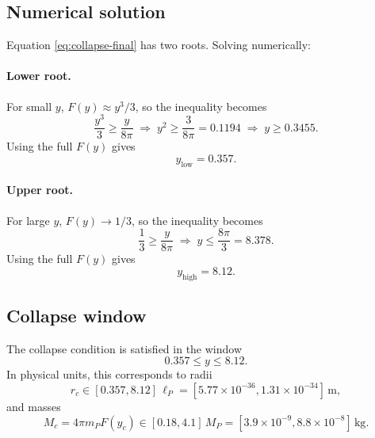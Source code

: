 \documentclass[a4paper,7pt,oneside,openany]{book}
\begin{document}
\subsection{Numerical solution}

Equation \eqref{eq:collapse-final} has two roots. Solving 
numerically:

\paragraph{Lower root.}
For small $y$, $F(y)\approx y^{3}/3$, so the inequality becomes
\begin{equation}
\frac{y^{3}}{3}\ge\frac{y}{8\pi}
\;\Longrightarrow\;
y^{2}\ge\frac{3}{8\pi}=0.1194
\;\Longrightarrow\;
y\ge0.3455.
\label{eq:lower-approx}
\end{equation}
Using the full $F(y)$ gives
\begin{equation}
y_{\text{low}}=0.357.
\label{eq:ylow}
\end{equation}

\paragraph{Upper root.}
For large $y$, $F(y)\to 1/3$, so the inequality becomes
\begin{equation}
\frac{1}{3}\ge\frac{y}{8\pi}
\;\Longrightarrow\;
y\le\frac{8\pi}{3}=8.378.
\label{eq:upper-approx}
\end{equation}
Using the full $F(y)$ gives
\begin{equation}
y_{\text{high}}=8.12.
\label{eq:yhigh}
\end{equation}

\subsection{Collapse window}

The collapse condition is satisfied in the window
\begin{equation}
\boxed{\;0.357\le y\le 8.12.\;}
\label{eq:window}
\end{equation}
In physical units, this corresponds to radii
\begin{equation}
r_{c}\in[0.357,8.12]\,\ell_{P}
=
[5.77\times 10^{-36},1.31\times 10^{-34}]\,\text{m},
\label{eq:rc-window}
\end{equation}
and masses
\begin{equation}
M_{c}=4\pi m_{P}F(y_{c})
\in
[0.18,4.1]\,M_{P}
=
[3.9\times 10^{-9},8.8\times 10^{-8}]\,\text{kg}.
\label{eq:Mc-window}
\end{equation}
\end{document}
